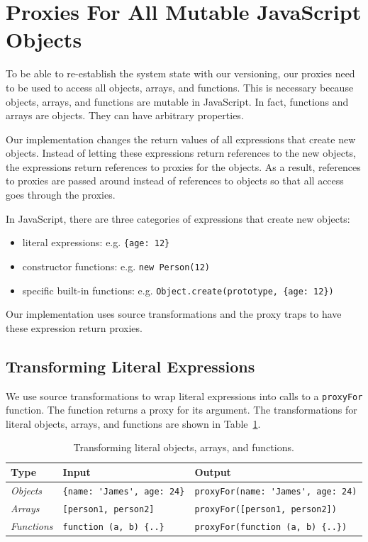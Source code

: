 \section{Proxies For All Mutable JavaScript Objects}

To be able to re-establish the system state with our versioning, our proxies need to be used to access all objects, arrays, and functions.
This is necessary because objects, arrays, and functions are mutable in JavaScript.
In fact, functions and arrays are objects.
They can have arbitrary properties.

Our implementation changes the return values of all expressions that create new objects.
Instead of letting these expressions return references to the new objects, the expressions return references to proxies for the objects.
As a result, references to proxies are passed around instead of references to objects so that all access goes through the proxies.

In JavaScript, there are three categories of expressions that create new objects: 
\begin{itemize}
    \item literal expressions: e.g. \lstinline|{age: 12}|
    \item constructor functions: e.g. \lstinline|new Person(12)|
    \item specific built-in functions: e.g. \lstinline|Object.create(prototype, {age: 12})|
\end{itemize}

Our implementation uses source transformations and the proxy traps to have these expression return proxies.


\subsection{Transforming Literal Expressions}

We use source transformations to wrap literal expressions into calls to a \lstinline{proxyFor} function.
The function returns a proxy for its argument.
The transformations for literal objects, arrays, and functions are shown in Table~\ref{table:literalTransforms}.

\begin{table}[h]
\begin{center}
\begin{tabular}{| l | l | l |}
\hline
Type & Input & Output \\ \hline
\emph{Objects} & \lstinline|{name: 'James', age: 24}| & \lstinline|proxyFor(name: 'James', age: 24)| \\ \hline
\emph{Arrays} & \lstinline|[person1, person2]| & \lstinline|proxyFor([person1, person2])| \\ \hline
\emph{Functions} & \lstinline|function (a, b) {..}| & \lstinline|proxyFor(function (a, b) {..})| \\ \hline
\end{tabular}
\end{center}
\caption[Table caption text]{Transforming literal objects, arrays, and functions.}
\label{table:literalTransforms}
\end{table}

